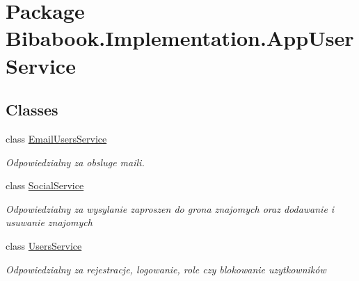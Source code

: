 \hypertarget{namespace_bibabook_1_1_implementation_1_1_app_user_service}{}\section{Package Bibabook.\+Implementation.\+App\+User\+Service}
\label{namespace_bibabook_1_1_implementation_1_1_app_user_service}
\subsection*{Classes}
\begin{DoxyCompactItemize}
\item 
class \hyperlink{class_bibabook_1_1_implementation_1_1_app_user_service_1_1_email_users_service}{Email\+Users\+Service}
\begin{DoxyCompactList}\small\item\em Odpowiedzialny za obsluge maili. \end{DoxyCompactList}\item 
class \hyperlink{class_bibabook_1_1_implementation_1_1_app_user_service_1_1_social_service}{Social\+Service}
\begin{DoxyCompactList}\small\item\em Odpowiedzialny za wysylanie zaproszen do grona znajomych oraz dodawanie i usuwanie znajomych \end{DoxyCompactList}\item 
class \hyperlink{class_bibabook_1_1_implementation_1_1_app_user_service_1_1_users_service}{Users\+Service}
\begin{DoxyCompactList}\small\item\em Odpowiedzialny za rejestracje, logowanie, role czy blokowanie uzytkowników \end{DoxyCompactList}\end{DoxyCompactItemize}
